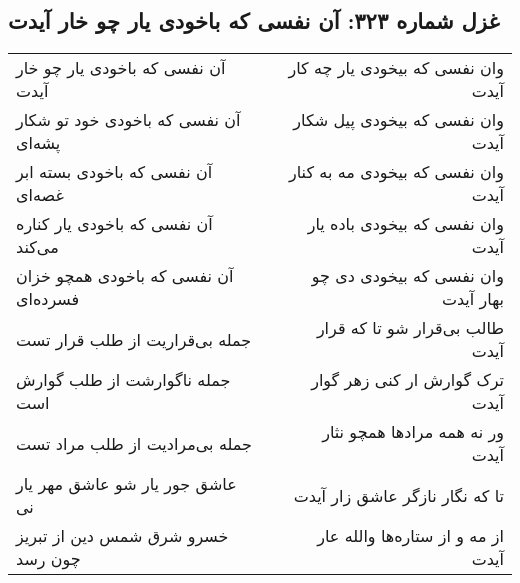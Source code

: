 \begin{center}
\section*{غزل شماره ۳۲۳: آن نفسی که باخودی یار چو خار آیدت}
\label{sec:0323}
\begin{longtable}{l p{0.5cm} r}
آن نفسی که باخودی یار چو خار آیدت
&&
وان نفسی که بیخودی یار چه کار آیدت
\\
آن نفسی که باخودی خود تو شکار پشه‌ای
&&
وان نفسی که بیخودی پیل شکار آیدت
\\
آن نفسی که باخودی بسته ابر غصه‌ای
&&
وان نفسی که بیخودی مه به کنار آیدت
\\
آن نفسی که باخودی یار کناره می‌کند
&&
وان نفسی که بیخودی باده یار آیدت
\\
آن نفسی که باخودی همچو خزان فسرده‌ای
&&
وان نفسی که بیخودی دی چو بهار آیدت
\\
جمله بی‌قراریت از طلب قرار تست
&&
طالب بی‌قرار شو تا که قرار آیدت
\\
جمله ناگوارشت از طلب گوارش است
&&
ترک گوارش ار کنی زهر گوار آیدت
\\
جمله بی‌مرادیت از طلب مراد تست
&&
ور نه همه مرادها همچو نثار آیدت
\\
عاشق جور یار شو عاشق مهر یار نی
&&
تا که نگار نازگر عاشق زار آیدت
\\
خسرو شرق شمس دین از تبریز چون رسد
&&
از مه و از ستاره‌ها والله عار آیدت
\\
\end{longtable}
\end{center}

